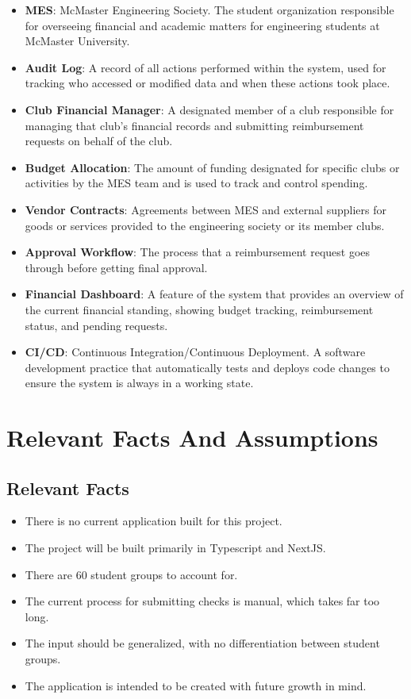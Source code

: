 \documentclass[12pt]{article}
\begin{document}
\begin{itemize}
    \item \textbf{MES}: McMaster Engineering Society. The student organization responsible for overseeing financial and academic matters for engineering students at McMaster University.    
    \item \textbf{Audit Log}: A record of all actions performed within the system, used for tracking who accessed or modified data and when these actions took place.
    \item \textbf{Club Financial Manager}: A designated member of a club responsible for managing that club's financial records and submitting reimbursement requests on behalf of the club.
    \item \textbf{Budget Allocation}: The amount of funding designated for specific clubs or activities by the MES team and is used to track and control spending.
    \item \textbf{Vendor Contracts}: Agreements between MES and external suppliers for goods or services provided to the engineering society or its member clubs.
    \item \textbf{Approval Workflow}: The process that a reimbursement request goes through before getting final approval.
    \item \textbf{Financial Dashboard}: A feature of the system that provides an overview of the current financial standing, showing budget tracking, reimbursement status, and pending requests.
    \item \textbf{CI/CD}: Continuous Integration/Continuous Deployment. A software development practice that automatically tests and deploys code changes to ensure the system is always in a working state.
\end{itemize}


\section{Relevant Facts And Assumptions}
\subsection{Relevant Facts}
\begin{itemize}
  \item There is no current application built for this project.
  \item The project will be built primarily in Typescript and NextJS.
  \item There are 60 student groups to account for.
  \item The current process for submitting checks is manual, which takes far too long.
  \item The input should be generalized, with no differentiation between student groups.
  \item The application is intended to be created with future growth in mind.
\end{itemize}
\end{document}
